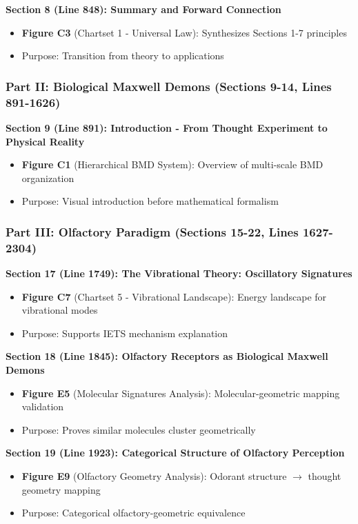 \documentclass[11pt]{article}
\begin{document}
\textbf{Section 8 (Line 848): Summary and Forward Connection}
\begin{itemize}
\item \textbf{Figure C3} (Chartset 1 - Universal Law): Synthesizes Sections 1-7 principles
\item Purpose: Transition from theory to applications
\end{itemize}

\subsubsection{Part II: Biological Maxwell Demons (Sections 9-14, Lines 891-1626)}

\textbf{Section 9 (Line 891): Introduction - From Thought Experiment to Physical Reality}
\begin{itemize}
\item \textbf{Figure C1} (Hierarchical BMD System): Overview of multi-scale BMD organization
\item Purpose: Visual introduction before mathematical formalism
\end{itemize}

\subsubsection{Part III: Olfactory Paradigm (Sections 15-22, Lines 1627-2304)}

\textbf{Section 17 (Line 1749): The Vibrational Theory: Oscillatory Signatures}
\begin{itemize}
\item \textbf{Figure C7} (Chartset 5 - Vibrational Landscape): Energy landscape for vibrational modes
\item Purpose: Supports IETS mechanism explanation
\end{itemize}

\textbf{Section 18 (Line 1845): Olfactory Receptors as Biological Maxwell Demons}
\begin{itemize}
\item \textbf{Figure E5} (Molecular Signatures Analysis): Molecular-geometric mapping validation
\item Purpose: Proves similar molecules cluster geometrically
\end{itemize}

\textbf{Section 19 (Line 1923): Categorical Structure of Olfactory Perception}
\begin{itemize}
\item \textbf{Figure E9} (Olfactory Geometry Analysis): Odorant structure $\to$ thought geometry mapping
\item Purpose: Categorical olfactory-geometric equivalence
\end{itemize}
\end{document}
